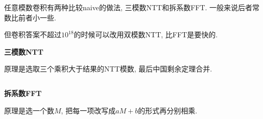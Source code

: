 任意模数卷积有两种比较naive的做法, 三模数NTT和拆系数FFT. 一般来说后者常数比前者小一些.

但卷积答案不超过$10 ^ {18}$的时候可以改用双模数NTT, 比FFT是要快的.

\textbf{三模数NTT}

原理是选取三个乘积大于结果的NTT模数, 最后中国剩余定理合并.

\inputminted[]{cpp}{../src/math/三模数NTT.cpp}

\textbf{拆系数FFT}

原理是选一个数$M$, 把每一项改写成$a M + b$的形式再分别相乘.

\inputminted[]{cpp}{../src/math/拆系数FFT.cpp}